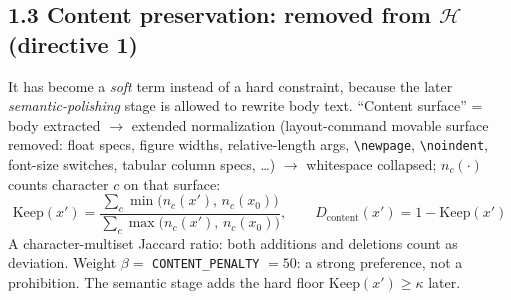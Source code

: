 \documentclass[10pt,a4paper]{article}
\begin{document}
\subsection*{1.3 Content preservation: removed from $\mathcal{H}$ (directive 1)}
It has become a \emph{soft} term instead of a hard constraint, because the later
\emph{semantic-polishing} stage is allowed to rewrite body text.
``Content surface'' = body extracted $\to$ extended normalization (layout-command movable
surface removed: float specs, figure widths, relative-length args, \texttt{\textbackslash newpage},
\texttt{\textbackslash noindent}, font-size switches, tabular column specs, \dots) $\to$ whitespace collapsed;
$n_c(\cdot)$ counts character $c$ on that surface:
\[
\mathrm{Keep}(x')=\frac{\sum_{c}\min\big(n_c(x'),\,n_c(x_0)\big)}
{\sum_{c}\max\big(n_c(x'),\,n_c(x_0)\big)},
\qquad
D_{\text{content}}(x')=1-\mathrm{Keep}(x')
\]
A character-multiset Jaccard ratio: both additions and deletions count as deviation.
Weight $\beta = $ \texttt{CONTENT\_PENALTY} $=50$: a strong preference, not a prohibition.
The semantic stage adds the hard floor $\mathrm{Keep}(x')\ge\kappa$ later.
\end{document}
